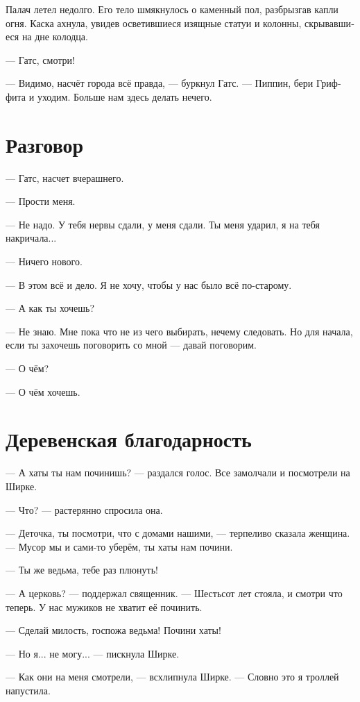 \documentclass[a4paper,12pt,fleqn]{book}\usepackage{polyglossia}\setdefaultlanguage[babelshorthands=true]{russian}\setotherlanguage{english}\defaultfontfeatures{Ligatures=TeX,Mapping=tex-text}\usepackage{xcolor}\newcommand{\ml}[3]{#2}
\newcommand{\asterism}{\vspace{1em}{\centering\Large\bfseries$\ast~\ast~\ast$\par}\vspace{1em}}
\begin{document}
Палач летел недолго.
Его тело шмякнулось о каменный пол, разбрызгав капли огня.
Каска ахнула, увидев осветившиеся изящные статуи и колонны, скрывавшиеся на дне колодца.

--- Гатс, смотри!

--- Видимо, насчёт города всё правда, --- буркнул Гатс.
--- Пиппин, бери Гриффита и уходим.
Больше нам здесь делать нечего.

\section{Разговор}

--- Гатс, насчет вчерашнего.

--- Прости меня.

--- Не надо.
У тебя нервы сдали, у меня сдали.
Ты меня ударил, я на тебя накричала...

--- Ничего нового.

--- В этом всё и дело.
Я не хочу, чтобы у нас было всё по-старому.

--- А как ты хочешь?

--- Не знаю.
Мне пока что не из чего выбирать, нечему следовать.
Но для начала, если ты захочешь поговорить со мной --- давай поговорим.

--- О чём?

--- О чём хочешь.

\section{Деревенская благодарность}

--- А хаты ты нам починишь? --- раздался голос. 
Все замолчали и посмотрели на Ширке.

--- Что? --- растерянно спросила она.

--- Деточка, ты посмотри, что с домами нашими, --- терпеливо сказала женщина.
--- Мусор мы и сами-то уберём, ты хаты нам почини.

--- Ты же ведьма, тебе раз плюнуть!

--- А церковь? --- поддержал священник. --- Шестьсот лет стояла, и смотри что теперь.
У нас мужиков не хватит её починить.

--- Сделай милость, госпожа ведьма!
Почини хаты!

--- Но я... не могу... --- пискнула Ширке.

\asterism

--- Как они на меня смотрели, --- всхлипнула Ширке.
--- Словно это я троллей напустила.
\end{document}
